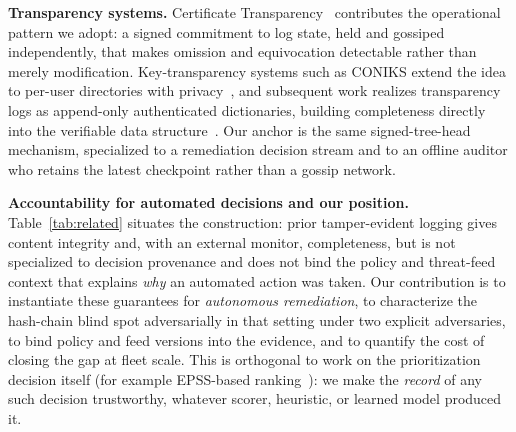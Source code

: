 \documentclass[journal]{IEEEtran}
\begin{document}
\textbf{Transparency systems.} Certificate
Transparency~\cite{rfc6962,laurie2014ct}
contributes the operational pattern we adopt: a signed commitment to log state,
held and gossiped independently, that makes omission and equivocation
detectable rather than merely modification. Key-transparency systems such as
CONIKS extend the idea to per-user directories with privacy~\cite{melara2015coniks},
and subsequent work realizes transparency logs as append-only authenticated
dictionaries, building completeness directly into the verifiable data
structure~\cite{tomescu2019transparency}.
Our anchor is the same signed-tree-head mechanism, specialized to a
remediation decision stream and to an offline auditor who retains the latest
checkpoint rather than a gossip network.

\textbf{Accountability for automated decisions and our position.}
Table~\ref{tab:related} situates the construction: prior tamper-evident logging
gives content integrity and, with an external monitor, completeness, but is not
specialized to decision provenance and does not bind the policy and
threat-feed context that explains \emph{why} an automated action was taken. Our
contribution is to instantiate these guarantees for \emph{autonomous
remediation}, to characterize the hash-chain blind spot adversarially in that
setting under two explicit adversaries, to bind policy and feed versions into
the evidence, and to quantify the cost of closing the gap at fleet scale. This
is orthogonal to work on the prioritization decision itself (for example
EPSS-based ranking~\cite{jacobs2021epss}): we make the \emph{record} of any such
decision trustworthy, whatever scorer, heuristic, or learned model produced it.
\end{document}
